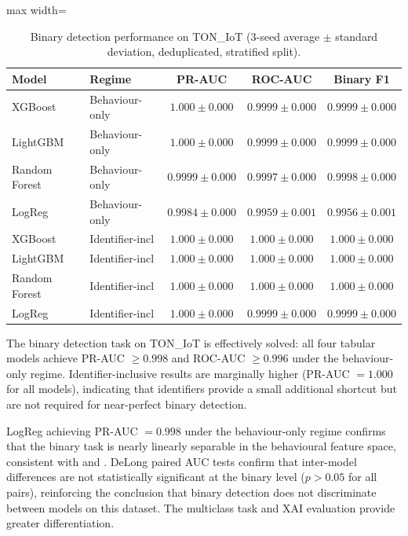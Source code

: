 \documentclass[12pt,a4paper]{report}
\begin{document}
\begin{table}[H]
\centering
\caption{Binary detection performance on TON\_IoT (3-seed average $\pm$ standard deviation, deduplicated, stratified split).}
\label{tab:binary}
\begin{adjustbox}{max width=\textwidth}
\begin{tabular}{llccc}
\toprule
\textbf{Model} & \textbf{Regime} & \textbf{PR-AUC} & \textbf{ROC-AUC} & \textbf{Binary F1} \\
\midrule
XGBoost & Behaviour-only & $1.000 \pm 0.000$ & $0.9999 \pm 0.000$ & $0.9999 \pm 0.000$ \\
LightGBM & Behaviour-only & $1.000 \pm 0.000$ & $0.9999 \pm 0.000$ & $0.9999 \pm 0.000$ \\
Random Forest & Behaviour-only & $0.9999 \pm 0.000$ & $0.9997 \pm 0.000$ & $0.9998 \pm 0.000$ \\
LogReg & Behaviour-only & $0.9984 \pm 0.000$ & $0.9959 \pm 0.001$ & $0.9956 \pm 0.001$ \\
\midrule
XGBoost & Identifier-incl & $1.000 \pm 0.000$ & $1.000 \pm 0.000$ & $1.000 \pm 0.000$ \\
LightGBM & Identifier-incl & $1.000 \pm 0.000$ & $1.000 \pm 0.000$ & $1.000 \pm 0.000$ \\
Random Forest & Identifier-incl & $1.000 \pm 0.000$ & $1.000 \pm 0.000$ & $1.000 \pm 0.000$ \\
LogReg & Identifier-incl & $1.000 \pm 0.000$ & $0.9999 \pm 0.000$ & $0.9999 \pm 0.000$ \\
\bottomrule
\end{tabular}
\end{adjustbox}
\end{table}

The binary detection task on TON\_IoT is effectively solved: all four tabular models achieve PR-AUC $\geq 0.998$ and ROC-AUC $\geq 0.996$ under the behaviour-only regime. Identifier-inclusive results are marginally higher (PR-AUC $= 1.000$ for all models), indicating that identifiers provide a small additional shortcut but are not required for near-perfect binary detection.

LogReg achieving PR-AUC $= 0.998$ under the behaviour-only regime confirms that the binary task is nearly linearly separable in the behavioural feature space, consistent with \cite{alsaedi2020} and \cite{moustafa2021}. DeLong paired AUC tests confirm that inter-model differences are not statistically significant at the binary level ($p > 0.05$ for all pairs), reinforcing the conclusion that binary detection does not discriminate between models on this dataset. The multiclass task and XAI evaluation provide greater differentiation.
\end{document}
